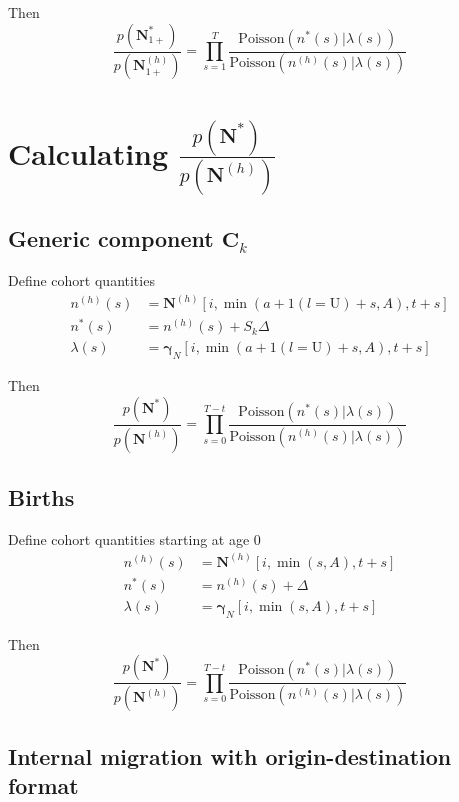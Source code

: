 \documentclass{article}
\begin{document}
Then
\begin{equation}
  \frac{p(\bm{N}_{1+}^*)}{p(\bm{N}_{1+}^{(h)})} = \prod_{s = 1}^T \frac{ \text{Poisson}\left( n^*(s) | \lambda(s) \right) }{ \text{Poisson}\left( n^{(h)}(s) | \lambda(s) \right) }
\end{equation}


\section{Calculating $\frac{p(\bm{N}^*)}{p(\bm{N}^{(h)})}$}

\subsection{Generic component $\bm{C}_k$}

Define cohort quantities
\begin{align}
  n^{(h)}(s) & = \bm{N}^{(h)}[i, \min(a + 1(l = \text{U}) + s, A), t + s] \\
  n^*(s) & = n^{(h)}(s) + S_k \Delta \\
  \lambda(s) & = \bm{\gamma}_N[i, \min(a + 1(l = \text{U}) + s, A), t + s]
\end{align}

Then
\begin{equation}
  \frac{p(\bm{N}^*)}{p(\bm{N}^{(h)})} = \prod_{s = 0}^{T-t} \frac{ \text{Poisson}\left( n^*(s) | \lambda(s) \right) }{ \text{Poisson}\left( n^{(h)}(s) | \lambda(s) \right) }
\end{equation}

\subsection{Births}

Define cohort quantities starting at age 0
\begin{align}
  n^{(h)}(s) & = \bm{N}^{(h)}[i, \min(s, A), t + s] \\
  n^*(s) & = n^{(h)}(s) + \Delta \\
  \lambda(s) & = \bm{\gamma}_N[i, \min(s, A), t + s]
\end{align}

Then
\begin{equation}
  \frac{p(\bm{N}^*)}{p(\bm{N}^{(h)})} = \prod_{s = 0}^{T-t} \frac{ \text{Poisson}( n^*(s) | \lambda(s) ) }{ \text{Poisson}( n^{(h)}(s) | \lambda(s) ) }
\end{equation}


\subsection{Internal migration with origin-destination format}
\end{document}
